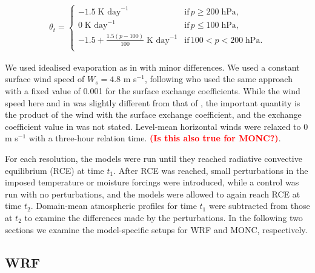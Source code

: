 \documentclass[draft]{agujournal2019}
\newcommand{\todo}[1]{\textcolor{red}{\textbf{(#1)}}}
\begin{document}
\begin{align}
 \theta_t = \begin{cases}
    -1.5\; \textrm{K day}^{-1} & \textrm{if}\, p \geq 200\; \textrm{hPa}, \\
    0\; \textrm{K day}^{-1} & \textrm{if}\, p \leq 100\; \textrm{hPa}, \\
    -1.5 + \frac{1.5 (p-100)}{100}\; \textrm{K day}^{-1} & \textrm{if}\, 100 < p < 200\; \textrm{hPa}. \\
 \end{cases}
\end{align}

We used idealised evaporation as in  with minor
differences. We used a constant surface wind speed of $W_s = 4.8$ m s$^{-1}$,
following  who used the same approach with a fixed value
of 0.001 for the surface exchange coefficients. While the wind speed here and in
 was slightly different from that of
, the important quantity is the product of the wind with
the surface exchange coefficient, and the exchange coefficient value in
 was not stated. Level-mean horizontal winds were relaxed
to 0 m s$^{-1}$ with a three-hour relation time. \todo{Is this also true for
MONC?}.

For each resolution, the models were run until they reached radiative convective
equilibrium (RCE) at time $t_1$. After RCE was reached, small perturbations in the imposed
temperature or moisture forcings were introduced, while a control was run with no
perturbations, and the models were allowed to again reach RCE at time $t_2$.
Domain-mean atmospheric profiles for time $t_1$ were subtracted from those at
$t_2$ to examine the differences made by the perturbations. In the following two
sections we examine the model-specific setups for WRF and MONC, respectively.

\subsection{WRF}
\end{document}

